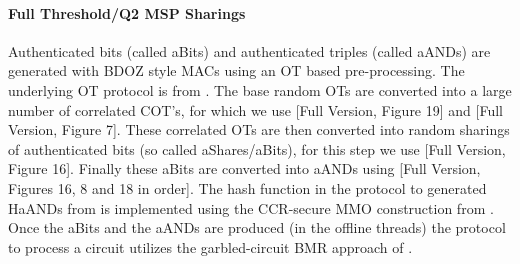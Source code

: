 \paragraph{Full Threshold/Q2 MSP Sharings}
Authenticated bits (called aBits) and authenticated triples (called aANDs) 
are generated with BDOZ style MACs using an OT based pre-processing.
The underlying OT protocol is from \cite{CO15}.
The base random OTs are  converted into a large number of
correlated COT's, for which we use \cite{AC:FKOS15}[Full Version, Figure 19]
and \cite{C:KelOrsSch15}[Full Version, Figure 7].
These correlated OTs are then converted into random sharings of authenticated
bits (so called aShares/aBits), for this step we use \cite{AC:HazSchSor17}[Full Version, Figure 16].
Finally these aBits are converted into aANDs using
\cite{CCS:WanRanKat17b}[Full Version, Figures 16, 8 and 18 in order].
The hash function in the protocol to generated HaANDs from \cite{CCS:WanRanKat17b}
is implemented using the CCR-secure MMO construction from \cite{GKWY19}.
Once the aBits and the aANDs are produced (in the offline threads) 
the protocol to process a circuit utilizes the garbled-circuit BMR approach of
\cite{AC:HazSchSor17}.

